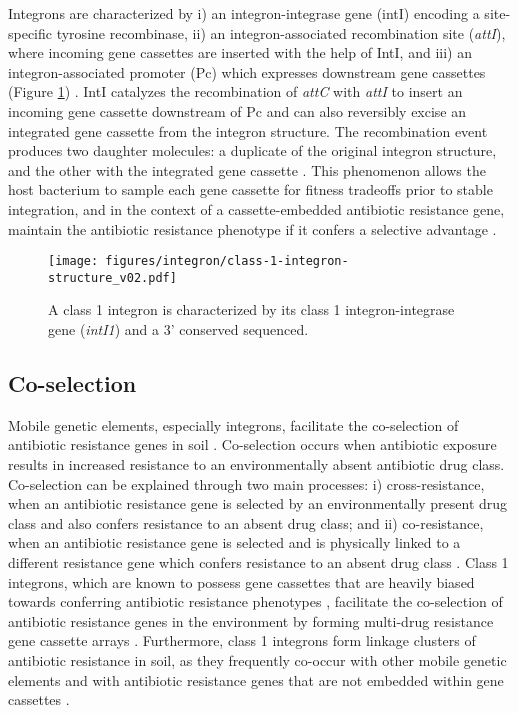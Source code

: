 Integrons are characterized by i) an integron-integrase gene (intI) encoding a site-specific tyrosine recombinase, ii) an integron-associated recombination site (\textit{attI}), where incoming gene cassettes are inserted with the help of IntI, and iii) an integron-associated promoter (Pc) which expresses downstream gene cassettes (Figure \ref{fig:class-1-integron-structure}) \parencite{Gillings.2014}.
IntI catalyzes the recombination of \textit{attC} with \textit{attI} to insert an incoming gene cassette downstream of Pc and can also reversibly excise an integrated gene cassette from the integron structure.
The recombination event produces two daughter molecules: a duplicate of the original integron structure, and the other with the integrated gene cassette \parencite{Ghaly.2020}.
This phenomenon allows the host bacterium to sample each gene cassette for fitness tradeoffs prior to stable integration, and in the context of a cassette-embedded antibiotic resistance gene, maintain the antibiotic resistance phenotype if it confers a selective advantage \parencite{Ghaly.2020}.

\begin{figure}[htpb]
	\centering
		\texttt{[image: figures/integron/class-1-integron-structure\_v02.pdf]}
	\caption[Structure of a class 1 integron.]{
		A class 1 integron is characterized by its class 1 integron-integrase gene (\textit{intI1}) and a 3' conserved sequenced.
	}
	\label{fig:class-1-integron-structure}
\end{figure}

\subsection{Co-selection}

Mobile genetic elements, especially integrons, facilitate the co-selection of antibiotic resistance genes in soil \parencite{Pal.2015}.
Co-selection occurs when antibiotic exposure results in increased resistance to an environmentally absent antibiotic drug class.
Co-selection can be explained through two main processes: i) cross-resistance, when an antibiotic resistance gene is selected by an environmentally present drug class and also confers resistance to an absent drug class; and ii) co-resistance, when an antibiotic resistance gene is selected and is physically linked to a different resistance gene which confers resistance to an absent drug class \parencite{Wales.2015}.
Class 1 integrons, which are known to possess gene cassettes that are heavily biased towards conferring antibiotic resistance phenotypes \parencite{Ghaly.2020, Yang.2021}, facilitate the co-selection of antibiotic resistance genes in the environment by forming multi-drug resistance gene cassette arrays \parencite{Naas.2001}.
Furthermore, class 1 integrons form linkage clusters of antibiotic resistance in soil, as they frequently co-occur with other mobile genetic elements and with antibiotic resistance genes that are not embedded within gene cassettes \parencite{Johnson.2016, Pal.2015}.

